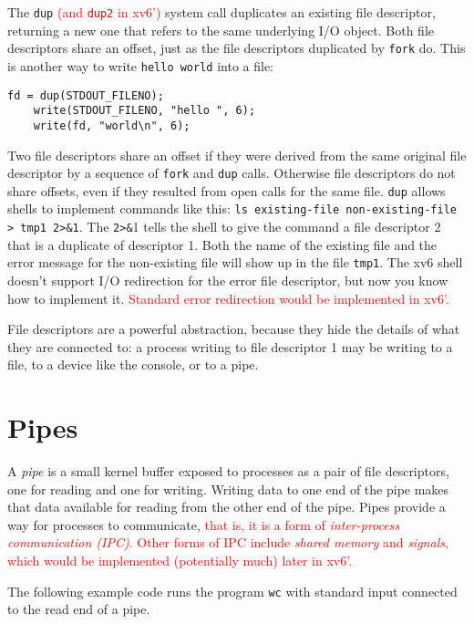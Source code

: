 \documentclass{report}
\begin{document}
	The \texttt{dup} \textcolor{red}{(and \texttt{dup2} in xv6')} system call duplicates an existing file 
	descriptor, returning a new one that
	refers to the same underlying I/O object. Both file descriptors share an offset, just as
	the file descriptors duplicated by \texttt{fork} do. This is another way to write \texttt{hello world}
	into a file:
	
	\begin{lstlisting}[style=c]
	fd = dup(STDOUT_FILENO);
	write(STDOUT_FILENO, "hello ", 6);
	write(fd, "world\n", 6);
	\end{lstlisting}
	
	Two file descriptors share an offset if they were derived from the same original
	file descriptor by a sequence of \texttt{fork} and \texttt{dup} calls. Otherwise file descriptors do not
	share offsets, even if they resulted from open calls for the same file. \texttt{dup} allows shells
	to implement commands like this: \texttt{ls existing-file non-existing-file > tmp1
	2>\&1}. The \texttt{2>\&}1 tells the shell to give the command a file descriptor 2 that is a duplicate 
	of descriptor 1. Both the name of the existing file and the error message for the
	non-existing file will show up in the file \texttt{tmp1}. The xv6 shell doesn't support I/O 
	redirection for the error file descriptor, but now you know how to implement it.
	\textcolor{red}{
		Standard error redirection would be implemented in xv6'.
	}
	
	File descriptors are a powerful abstraction, because they hide the details of what
	they are connected to: a process writing to file descriptor 1 may be writing to a file, to
	a device like the console, or to a pipe.
	
	\section{Pipes}
	A \emph{pipe} is a small kernel buffer exposed to processes as a pair of file descriptors,
	one for reading and one for writing. Writing data to one end of the pipe makes that
	data available for reading from the other end of the pipe. Pipes provide a way for
	processes to communicate, \textcolor{red}{
		that is, it is a form of \emph{inter-process communication (IPC)}.  Other forms of IPC
		include \emph{shared memory} and \emph{signals}, which would be implemented (potentially
		much) later in xv6'.
	}
	
	The following example code runs the program \texttt{wc} with standard input connected
	to the read end of a pipe.
	
\end{document}
